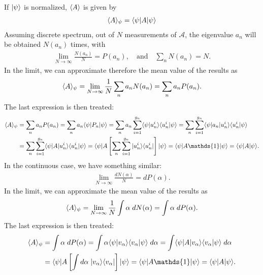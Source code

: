 If $|\psi\rangle$ is normalized, $\langle A\rangle$ is given by 
\begin{align}
    \langle A\rangle_\psi=\langle\psi|A|\psi\rangle
\end{align}
Assuming discrete spectrum, out of $N$ measurements of $\mathcal{A}$, the eigenvalue $a_n$ will be obtained $N(a_n)$ times, with 
\begin{align}
    \lim_{N\to\infty}\frac{N(a_n)}{N}=P(a_n),\quad\text{and}\quad\sum_nN(a_n)=N.
\end{align}
In the limit, we can approximate therefore the mean value of the results as 
\begin{align}
    \langle A\rangle_\psi=\lim_{N\to\infty}\frac{1}{N}\sum_na_nN(a_n)=\sum_na_nP(a_n).
\end{align}
The last expression is then treated:
\begin{align*}
    \braket{A}_\psi&=\sum_na_nP(a_n)=\sum_na_n\braket{\psi|P_n|\psi}=\sum_na_n\sum_{i=1}^{g_n}\braket{\psi|u_n^i}\braket{u_n^i|\psi}=\sum_n\sum_{i=1}^{g_n}\braket{\psi|a_n|u_n^i}\braket{u_n^i|\psi}\\
    &=\sum_n\sum_{i=1}^{g_n}\braket{\psi|A|u_n^i}\braket{u_n^i|\psi}=\bra{\psi}A\left[\sum_n\sum_{i=1}^{g_n}\ket{u_n^i}\bra{u_n^i}\right]\ket{\psi}=\braket{\psi|A\mathds{1}|\psi}=\braket{\psi|A|\psi}.
\end{align*}
In the continuous case, we have something similar:
\begin{align}
    \lim_{N\to\infty}\frac{dN(\alpha)}{N}=dP(\alpha).
\end{align}
In the limit, we can approximate the mean value of the results as 
\begin{align}
    \langle A\rangle_\psi=\lim_{N\to\infty}\frac{1}{N}\int\alpha\;dN(\alpha)=\int\alpha\;dP(\alpha).
\end{align}
The last expression is then treated:
\begin{align*}
    \braket{A}_\psi&=\int\alpha\;dP(\alpha)=\int\alpha\braket{\psi|v_\alpha}\braket{v_\alpha|\psi}\;d\alpha=\int\braket{\psi|A|v_\alpha}\braket{v_\alpha|\psi}\;d\alpha\\
    &=\bra{\psi}A\left[\int d\alpha\;\ket{v_\alpha}\bra{v_\alpha}\right]\ket{\psi}=\braket{\psi|A\mathds{1}|\psi}=\braket{\psi|A|\psi}.
\end{align*}
